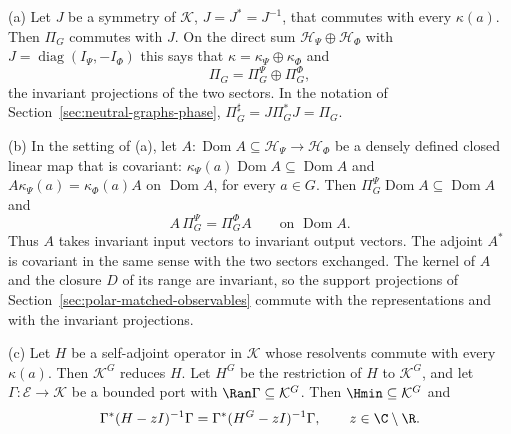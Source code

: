 \begin{proposition}
\label{prop:symmetry-compatibility}
\textup{(a)} Let $J$ be a symmetry of $\mathcal K$, $J=J^*=J^{-1}$, that commutes with every $\kappa(a)$. Then $\Pi_G$ commutes with $J$. On the direct sum $\mathcal H_\Psi\oplus\mathcal H_\Phi$ with $J=\operatorname{diag}(I_\Psi,-I_\Phi)$ this says that $\kappa=\kappa_\Psi\oplus\kappa_\Phi$ and
\begin{equation}
 \Pi_G=\Pi_G^\Psi\oplus\Pi_G^\Phi ,
 \label{eq:symmetry-sector-sum}
\end{equation}
the invariant projections of the two sectors. In the notation of Section~\ref{sec:neutral-graphs-phase}, $\Pi_G^\sharp=J\Pi_G^*J=\Pi_G$.

\textup{(b)} In the setting of \textup{(a)}, let $A:\operatorname{Dom}A\subseteq\mathcal H_\Psi\to\mathcal H_\Phi$ be a densely defined closed linear map that is covariant: $\kappa_\Psi(a)\operatorname{Dom}A\subseteq\operatorname{Dom}A$ and $A\kappa_\Psi(a)=\kappa_\Phi(a)A$ on $\operatorname{Dom}A$, for every $a\in G$. Then $\Pi_G^\Psi\operatorname{Dom}A\subseteq\operatorname{Dom}A$ and
\begin{equation}
 A\,\Pi_G^\Psi=\Pi_G^\Phi A\qquad\text{on }\operatorname{Dom}A .
 \label{eq:symmetry-covariant-map}
\end{equation}
Thus $A$ takes invariant input vectors to invariant output vectors. The adjoint $A^*$ is covariant in the same sense with the two sectors exchanged. The kernel of $A$ and the closure $D$ of its range are invariant, so the support projections of Section~\ref{sec:polar-matched-observables} commute with the representations and with the invariant projections.

\textup{(c)} Let $H$ be a self-adjoint operator in $\mathcal K$ whose resolvents commute with every $\kappa(a)$. Then $\mathcal K^G$ reduces $H$. Let $H^G$ be the restriction of $H$ to $\mathcal K^G$, and let $\Gamma:\mathcal E\to\mathcal K$ be a bounded port with $\Ran\Gamma\subseteq\mathcal K^G$. Then $\Hmin\subseteq\mathcal K^G$ and
\begin{equation}
 \Gamma^*(H-zI)^{-1}\Gamma=\Gamma^*(H^G-zI)^{-1}\Gamma ,\qquad z\in\C\setminus\R .
 \label{eq:symmetry-compressed-response}
\end{equation}
\end{proposition}
